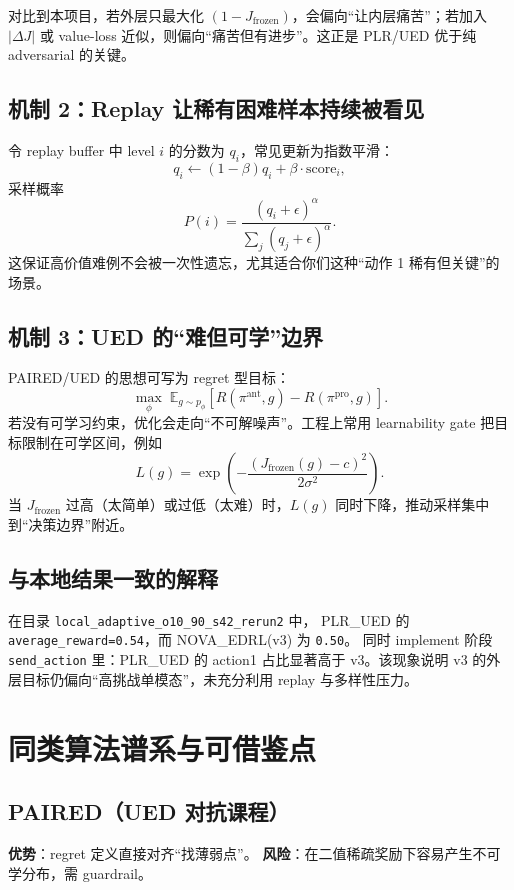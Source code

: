 \documentclass[UTF8,11pt,a4paper]{ctexart}
\begin{document}
对比到本项目，若外层只最大化 $(1-J_{\mathrm{frozen}})$，会偏向“让内层痛苦”；若加入 $|\Delta J|$ 或 value-loss 近似，则偏向“痛苦但有进步”。这正是 PLR/UED 优于纯 adversarial 的关键。

\subsection{机制 2：Replay 让稀有困难样本持续被看见}
令 replay buffer 中 level $i$ 的分数为 $q_i$，常见更新为指数平滑：
\begin{equation}
q_i\leftarrow (1-\beta)q_i+\beta\cdot \text{score}_i,
\end{equation}
采样概率
\begin{equation}
P(i)=\frac{(q_i+\epsilon)^\alpha}{\sum_j(q_j+\epsilon)^\alpha}.
\end{equation}
这保证高价值难例不会被一次性遗忘，尤其适合你们这种“动作 1 稀有但关键”的场景。

\subsection{机制 3：UED 的“难但可学”边界}
PAIRED/UED 的思想可写为 regret 型目标：
\begin{equation}
\max_{\phi}\;\mathbb{E}_{g\sim p_\phi}\left[ R(\pi^{\text{ant}},g)-R(\pi^{\text{pro}},g)\right].
\end{equation}
若没有可学习约束，优化会走向“不可解噪声”。工程上常用 learnability gate 把目标限制在可学区间，例如
\begin{equation}
L(g)=\exp\left(-\frac{(J_{\mathrm{frozen}}(g)-c)^2}{2\sigma^2}\right).
\end{equation}
当 $J_{\mathrm{frozen}}$ 过高（太简单）或过低（太难）时，$L(g)$ 同时下降，推动采样集中到“决策边界”附近。

\subsection{与本地结果一致的解释}
在目录 \texttt{local\_adaptive\_o10\_90\_s42\_rerun2} 中，
PLR\_UED 的 \texttt{average\_reward=0.54}，而 NOVA\_EDRL(v3) 为 \texttt{0.50}。
同时 implement 阶段 \texttt{send\_action} 里：PLR\_UED 的 action1 占比显著高于 v3。该现象说明 v3 的外层目标仍偏向“高挑战单模态”，未充分利用 replay 与多样性压力。

\section{同类算法谱系与可借鉴点}
\subsection{PAIRED（UED 对抗课程）}
\textbf{优势}：regret 定义直接对齐“找薄弱点”。
\textbf{风险}：在二值稀疏奖励下容易产生不可学分布，需 guardrail。
\end{document}
